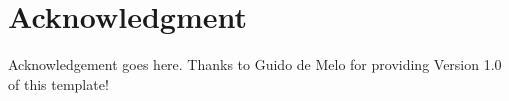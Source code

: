 \section*{Acknowledgment}
Acknowledgement goes here. Thanks to Guido de Melo for providing Version 1.0 of this template!